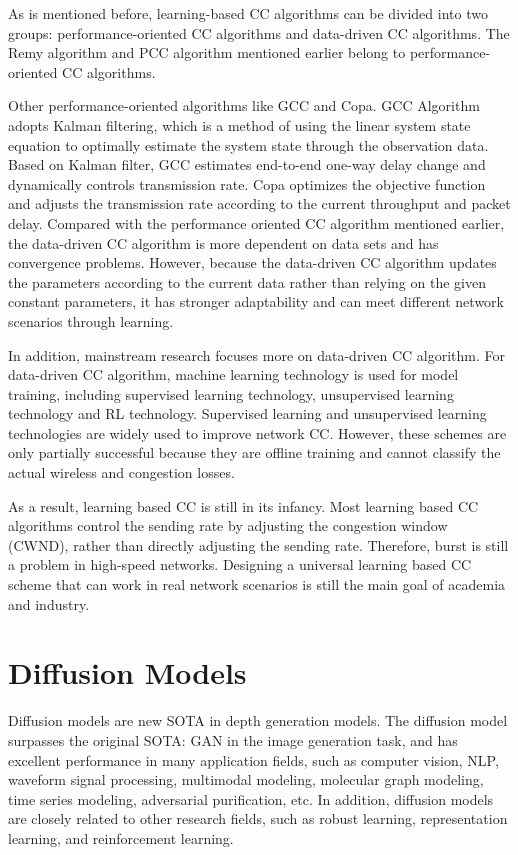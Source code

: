 \documentclass[conference]{IEEEtran}
\begin{document}
As is mentioned before, learning-based CC algorithms can be divided into two groups: performance-oriented CC algorithms and data-driven CC algorithms. The Remy algorithm and PCC algorithm mentioned earlier belong to performance-oriented CC algorithms. 

Other performance-oriented algorithms like GCC and Copa. GCC Algorithm adopts Kalman filtering, which is a method of using the linear system state equation to optimally estimate the system state through the observation data. Based on Kalman filter, GCC estimates end-to-end one-way delay change and dynamically controls transmission rate. Copa optimizes the objective function and adjusts the transmission rate according to the current throughput and packet delay. Compared with the performance oriented CC algorithm mentioned earlier, the data-driven CC algorithm is more dependent on data sets and has convergence problems. However, because the data-driven CC algorithm updates the parameters according to the current data rather than relying on the given constant parameters, it has stronger adaptability and can meet different network scenarios through learning. 

In addition, mainstream research focuses more on data-driven CC algorithm. For data-driven CC algorithm, machine learning technology is used for model training, including supervised learning technology, unsupervised learning technology and RL technology. Supervised learning and unsupervised learning technologies are widely used to improve network CC. However, these schemes are only partially successful because they are offline training and cannot classify the actual wireless and congestion losses. 

As a result, learning based CC is still in its infancy. Most learning based CC algorithms control the sending rate by adjusting the congestion window (CWND), rather than directly adjusting the sending rate. Therefore, burst is still a problem in high-speed networks. Designing a universal learning based CC scheme that can work in real network scenarios is still the main goal of academia and industry.

\section{Diffusion Models\cite{a8}}
Diffusion models are new SOTA in depth generation models. The diffusion model surpasses the original SOTA: GAN in the image generation task, and has excellent performance in many application fields, such as computer vision, NLP, waveform signal processing, multimodal modeling, molecular graph modeling, time series modeling, adversarial purification, etc. In addition, diffusion models are closely related to other research fields, such as robust learning, representation learning, and reinforcement learning.
\end{document}
